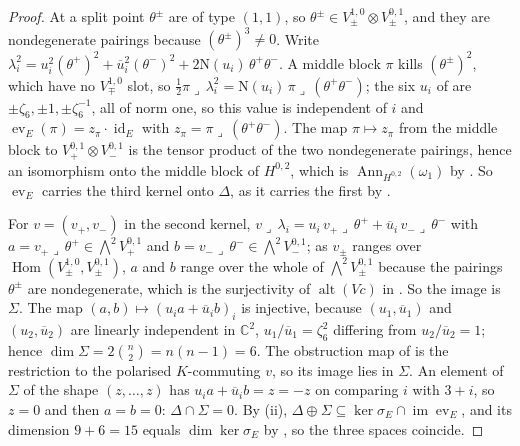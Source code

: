 \documentclass[11pt,reqno]{amsart}
\theoremstyle{plain}
\theoremstyle{definition}
\theoremstyle{remark}
\newcommand{\CC}{\mathbb{C}}
\newcommand{\Nm}{\mathrm{N}}             %
\DeclareMathOperator{\Hom}{Hom}
\DeclareMathOperator{\image}{im}
\DeclareMathOperator{\id}{id}
\DeclareMathOperator{\Ann}{Ann}
\newcommand{\bbar}[1]{\overline{#1}}
\begin{document}
\begin{proof}
At a split point $\theta^{\pm}$ are of type $(1,1)$, so $\theta^{\pm}\in
V_{\pm}^{1,0}\otimes V_{\pm}^{0,1}$, and they are nondegenerate pairings
because $(\theta^{\pm})^{3}\ne0$. Write $\lambda_{i}^{2}=u_{i}^{2}(\theta^{+})^{2}
+\bbar u_{i}^{2}(\theta^{-})^{2}+2\Nm(u_{i})\,\theta^{+}\theta^{-}$. A middle
block $\pi$ kills $(\theta^{\pm})^{2}$, which have no $V_{\mp}^{1,0}$ slot, so
$\tfrac12\pi\lrcorner\,\lambda_{i}^{2}=\Nm(u_{i})\,\pi\lrcorner\,(\theta^{+}\theta^{-})$;
the six $u_{i}$ of  are $\pm\zeta_{6},\pm1,
\pm\zeta_{6}^{-1}$, all of norm one, so this value is independent of $i$ and
$\operatorname{ev}_{E}(\pi)=z_{\pi}\cdot\id_{E}$ with
$z_{\pi}=\pi\lrcorner\,(\theta^{+}\theta^{-})$. The map $\pi\mapsto z_{\pi}$
from the middle block to $V_{+}^{0,1}\otimes V_{-}^{0,1}$ is the tensor
product of the two nondegenerate pairings, hence an isomorphism onto the
middle block of $H^{0,2}$, which is $\Ann_{H^{0,2}}(\omega_{1})$ by
\cite[Lemma~9.6]{paperI}. So $\operatorname{ev}_{E}$ carries the third kernel
onto $\Delta$, as it carries the first by \cite[Theorem~9.19]{paperI}.

For $v=(v_{+},v_{-})$ in the second kernel,
$v\lrcorner\,\lambda_{i}=u_{i}\,v_{+}\lrcorner\,\theta^{+}+\bbar u_{i}\,
v_{-}\lrcorner\,\theta^{-}$ with $a=v_{+}\lrcorner\,\theta^{+}\in
\bigwedge^{2}V_{+}^{0,1}$ and $b=v_{-}\lrcorner\,\theta^{-}\in\bigwedge^{2}V_{-}^{0,1}$;
as $v_{\pm}$ ranges over $\Hom(V_{\pm}^{1,0},V_{\pm}^{0,1})$, $a$ and $b$
range over the whole of $\bigwedge^{2}V_{\pm}^{0,1}$ because the pairings
$\theta^{\pm}$ are nondegenerate, which is the surjectivity of
$\operatorname{alt}(Vc)$ in \cite[(26)]{paperI}. So the image is $\Sigma$.
The map $(a,b)\mapsto(u_{i}a+\bbar u_{i}b)_{i}$ is injective, because
$(u_{1},\bbar u_{1})$ and $(u_{2},\bbar u_{2})$ are linearly independent in
$\CC^{2}$, $u_{1}/\bbar u_{1}=\zeta_{6}^{2}$ differing from
$u_{2}/\bbar u_{2}=1$; hence $\dim\Sigma=2\binom{n}{2}=n(n-1)=6$. The
obstruction map of  is the restriction to the
polarised $K$-commuting $v$, so its image lies in $\Sigma$. An element of
$\Sigma$ of the shape $(z,\dots,z)$ has $u_{i}a+\bbar u_{i}b=z=-z$ on
comparing $i$ with $3+i$, so $z=0$ and then $a=b=0$: $\Delta\cap\Sigma=0$.
By (ii), $\Delta\oplus\Sigma\subseteq\ker\sigma_{E}\cap\image\operatorname{ev}_{E}$,
and its dimension $9+6=15$ equals $\dim\ker\sigma_{E}$ by
, so the three spaces coincide.


\end{proof}
\end{document}
